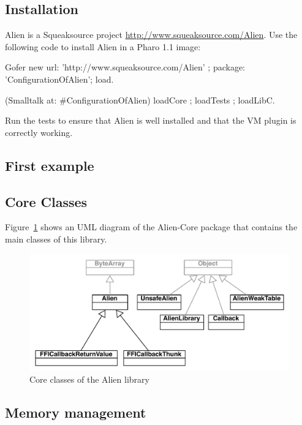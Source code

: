 \documentclass[a4paper,10pt,twoside]{book}
\begin{document}
\subsection{Installation} \label{sec:installation} %

Alien is a Squeaksource project \url{http://www.squeaksource.com/Alien}. 
Use the following code to install Alien in a Pharo 1.1 image:

\begin{code}{}
Gofer new
	url: 'http://www.squeaksource.com/Alien' ;
	package: 'ConfigurationOfAlien';
	load.

(Smalltalk at: #ConfigurationOfAlien) loadCore ; 
	loadTests ; 
	loadLibC.
\end{code}

Run the tests to ensure that Alien is well installed and that the VM plugin is correctly working.

\subsection{First example} \label{subsec:first_example} %




\subsection{Core Classes} 

Figure~\ref{fig:alien_uml} shows an UML diagram of the Alien-Core package that contains the main classes of this library.

\begin{figure}[htbp]
	\centering
		\includegraphics[width=0.9\linewidth]{figs/alien_uml}
	\caption{Core classes of the Alien library}
	\label{fig:alien_uml}
\end{figure}



\subsection{Memory management} \label{sec:memory_management} %
\end{document}
